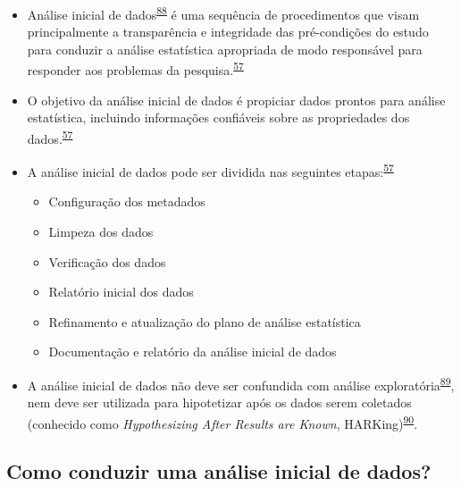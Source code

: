 \documentclass[
  a4paper,
]{book}
\begin{document}
\begin{itemize}
\item
  Análise inicial de dados\textsuperscript{\protect\hyperlink{ref-chatfield1986}{88}} é uma sequência de procedimentos que visam principalmente a transparência e integridade das pré-condições do estudo para conduzir a análise estatística apropriada de modo responsável para responder aos problemas da pesquisa.\textsuperscript{\protect\hyperlink{ref-Baillie2022}{57}}
\item
  O objetivo da análise inicial de dados é propiciar dados prontos para análise estatística, incluindo informações confiáveis sobre as propriedades dos dados.\textsuperscript{\protect\hyperlink{ref-Baillie2022}{57}}
\item
  A análise inicial de dados pode ser dividida nas seguintes etapas:\textsuperscript{\protect\hyperlink{ref-Baillie2022}{57}}

  \begin{itemize}
  \item
    Configuração dos metadados
  \item
    Limpeza dos dados
  \item
    Verificação dos dados
  \item
    Relatório inicial dos dados
  \item
    Refinamento e atualização do plano de análise estatística
  \item
    Documentação e relatório da análise inicial de dados
  \end{itemize}
\item
  A análise inicial de dados não deve ser confundida com análise exploratória\textsuperscript{\protect\hyperlink{ref-Ferketich1986}{89}}, nem deve ser utilizada para hipotetizar após os dados serem coletados (conhecido como \emph{Hypothesizing After Results are Known}, HARKing)\textsuperscript{\protect\hyperlink{ref-Kerr1998}{90}}.
\end{itemize}

\hypertarget{como-conduzir-uma-anuxe1lise-inicial-de-dados}{%
\subsection{Como conduzir uma análise inicial de dados?}\label{como-conduzir-uma-anuxe1lise-inicial-de-dados}}
\end{document}

